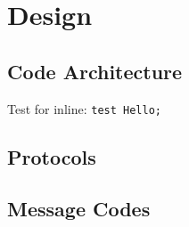 \chapter{Design}

\section{Code Architecture}

Test for inline: \lstinline{test Hello;}

\section{Protocols}



\pagebreak
\section{Message Codes}



\pagebreak
